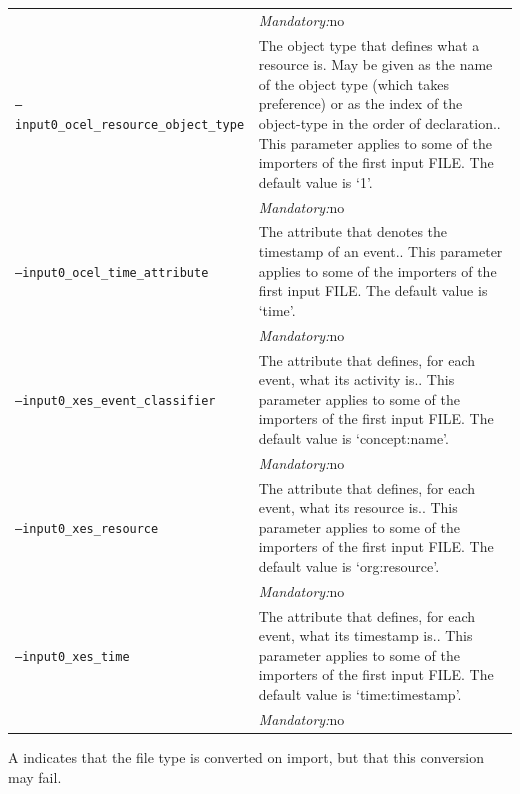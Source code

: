 {\begin{tabularx}{\linewidth}{lX}
&\textit{Mandatory:}\quad no\\
\texttt{--input0\_ocel\_resource\_object\_type} & The object type that defines what a resource is. May be given as the name of the object type (which takes preference) or as the index of the object-type in the order of declaration.. This parameter applies to some of the importers of the first input FILE. The default value is `1'.\\
&\textit{Mandatory:}\quad no\\
\texttt{--input0\_ocel\_time\_attribute} & The attribute that denotes the timestamp of an event.. This parameter applies to some of the importers of the first input FILE. The default value is `time'.\\
&\textit{Mandatory:}\quad no\\
\texttt{--input0\_xes\_event\_classifier} & The attribute that defines, for each event, what its activity is.. This parameter applies to some of the importers of the first input FILE. The default value is `concept:name'.\\
&\textit{Mandatory:}\quad no\\
\texttt{--input0\_xes\_resource} & The attribute that defines, for each event, what its resource is.. This parameter applies to some of the importers of the first input FILE. The default value is `org:resource'.\\
&\textit{Mandatory:}\quad no\\
\texttt{--input0\_xes\_time} & The attribute that defines, for each event, what its timestamp is.. This parameter applies to some of the importers of the first input FILE. The default value is `time:timestamp'.\\
&\textit{Mandatory:}\quad no\\
\bottomrule
\end{tabularx}
A \textdagger{} indicates that the file type is converted on import, but that this conversion may fail.
}
